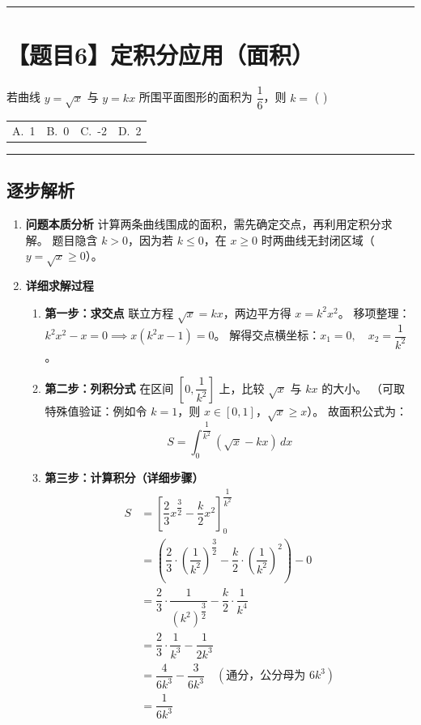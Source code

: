 \documentclass[UTF8,10pt]{ctexart}
\makeatletter
\newenvironment{redenv}{\color{red}}{}
\newenvironment{detailedanalysis}{%
    \color{red}
    \begin{enumerate}[label=\textbf{第\arabic*步：}, leftmargin=*, align=left, itemsep=0pt, parsep=0pt, topsep=0pt, partopsep=0pt]
}{%
    \end{enumerate}
}
\newcommand{\problemrule}{\par\filbreak\noindent\rule{\textwidth}{1.5pt}\vspace{-0.5em}}
\newcommand{\analysisrule}{\noindent\rule{\textwidth}{0.8pt}\vspace{-0.5em}}
\newcommand{\fourchoices}[4]{
    \par\noindent
    \begin{tabular*}{\linewidth}{@{\extracolsep{\fill}}llll}
        A.~#1 & B.~#2 & C.~#3 & D.~#4
    \end{tabular*}
}
\makeatother
\begin{document}
\problemrule
\section*{【题目6】定积分应用（面积）}
若曲线 $y = \sqrt{x}$ 与 $y = kx$ 所围平面图形的面积为 $\dfrac{1}{6}$，则 $k = $ ( \quad )
\fourchoices{1}{0}{-2}{2}

\begin{redenv}
\analysisrule
\subsection*{逐步解析}

\begin{detailedanalysis}
\item \textbf{问题本质分析}
计算两条曲线围成的面积，需先确定交点，再利用定积分求解。
题目隐含 $k>0$，因为若 $k \le 0$，在 $x \ge 0$ 时两曲线无封闭区域（$y=\sqrt{x} \ge 0$）。

\item \textbf{详细求解过程}
\begin{enumerate}[label=(\alph*)]
    \item \textbf{第一步：求交点}
    联立方程 $\sqrt{x} = kx$，两边平方得 $x = k^2 x^2$。
    移项整理：$k^2 x^2 - x = 0 \implies x(k^2 x - 1) = 0$。
    解得交点横坐标：$x_1 = 0, \quad x_2 = \dfrac{1}{k^2}$。

    \item \textbf{第二步：列积分式}
    在区间 $[0, \dfrac{1}{k^2}]$ 上，比较 $\sqrt{x}$ 与 $kx$ 的大小。
    （可取特殊值验证：例如令 $k=1$，则 $x \in [0,1]$，$\sqrt{x} \ge x$）。
    故面积公式为：
    \[ S = \int_0^{\dfrac{1}{k^2}} (\sqrt{x} - kx) \, dx \]

    \item \textbf{第三步：计算积分（详细步骤）}
    \begin{align*}
    S &= \left[ \dfrac{2}{3}x^{\dfrac{3}{2}} - \dfrac{k}{2}x^2 \right]_0^{\dfrac{1}{k^2}} \\
      &= \left( \dfrac{2}{3} \cdot \left(\dfrac{1}{k^2}\right)^{\dfrac{3}{2}} - \dfrac{k}{2} \cdot \left(\dfrac{1}{k^2}\right)^2 \right) - 0 \\
      &= \dfrac{2}{3} \cdot \dfrac{1}{(k^2)^{\dfrac{3}{2}}} - \dfrac{k}{2} \cdot \dfrac{1}{k^4} \\
      &= \dfrac{2}{3} \cdot \dfrac{1}{k^3} - \dfrac{1}{2k^3} \\
      &= \dfrac{4}{6k^3} - \dfrac{3}{6k^3} \quad (\text{通分，公分母为 } 6k^3) \\
      &= \dfrac{1}{6k^3}
    \end{align*}


\end{enumerate}
\end{detailedanalysis}
\end{redenv}
\end{document}
